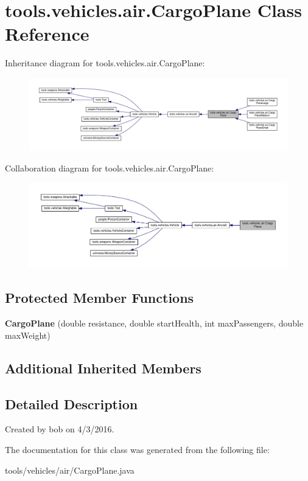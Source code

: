 \hypertarget{classtools_1_1vehicles_1_1air_1_1_cargo_plane}{}\section{tools.\+vehicles.\+air.\+Cargo\+Plane Class Reference}
\label{classtools_1_1vehicles_1_1air_1_1_cargo_plane}


Inheritance diagram for tools.\+vehicles.\+air.\+Cargo\+Plane\+:
\nopagebreak
\begin{figure}[H]
\begin{center}
\leavevmode
\includegraphics[width=350pt]{classtools_1_1vehicles_1_1air_1_1_cargo_plane__inherit__graph}
\end{center}
\end{figure}


Collaboration diagram for tools.\+vehicles.\+air.\+Cargo\+Plane\+:
\nopagebreak
\begin{figure}[H]
\begin{center}
\leavevmode
\includegraphics[width=350pt]{classtools_1_1vehicles_1_1air_1_1_cargo_plane__coll__graph}
\end{center}
\end{figure}
\subsection*{Protected Member Functions}
\begin{DoxyCompactItemize}
\item 
{\bfseries Cargo\+Plane} (double resistance, double start\+Health, int max\+Passengers, double max\+Weight)\hypertarget{classtools_1_1vehicles_1_1air_1_1_cargo_plane_a90a61b3a42662775433019f53c7d5b90}{}\label{classtools_1_1vehicles_1_1air_1_1_cargo_plane_a90a61b3a42662775433019f53c7d5b90}

\end{DoxyCompactItemize}
\subsection*{Additional Inherited Members}


\subsection{Detailed Description}
Created by bob on 4/3/2016. 

The documentation for this class was generated from the following file\+:\begin{DoxyCompactItemize}
\item 
tools/vehicles/air/Cargo\+Plane.\+java\end{DoxyCompactItemize}
